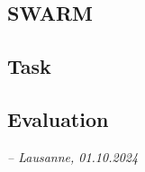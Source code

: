 \documentclass[conference, 10pt]{IEEEtran}
\begin{document}
\subsection{SWARM}
\label{subsec:swarm}


\subsection{Task}
\label{subsec:task}


\subsection{Evaluation}
\label{subsec:evaluation}


\textit{-- Lausanne, 01.10.2024}



\end{document}
